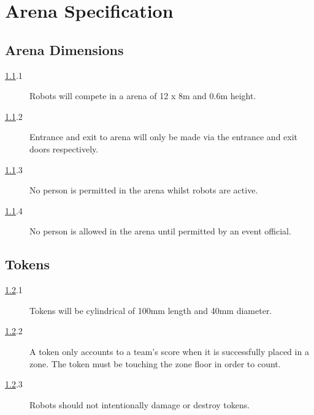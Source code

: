 \section {Arena Specification}

\subsection {Arena Dimensions}
\label{arena}

\begin {description}
\item [\ref{arena}.1] Robots will compete in a arena of 12 x 8m and 0.6m height.
\item [\ref{arena}.2] Entrance and exit to arena will only be made via the entrance and exit doors respectively.
\item [\ref{arena}.3] No person is permitted in the arena whilst robots are active.
\item [\ref{arena}.4] No person is allowed in the arena until permitted by an event official.
\end {description}

\subsection {Tokens}
\label{tokens}

\begin {description} 
\item [\ref{tokens}.1] Tokens will be cylindrical of 100mm length and 40mm diameter.
\item [\ref{tokens}.2] A token only accounts to a team's score when it is successfully placed in a zone. The token must be touching the zone floor in order to count.
\item [\ref{tokens}.3] Robots should not intentionally damage or destroy tokens.
\end {description}

